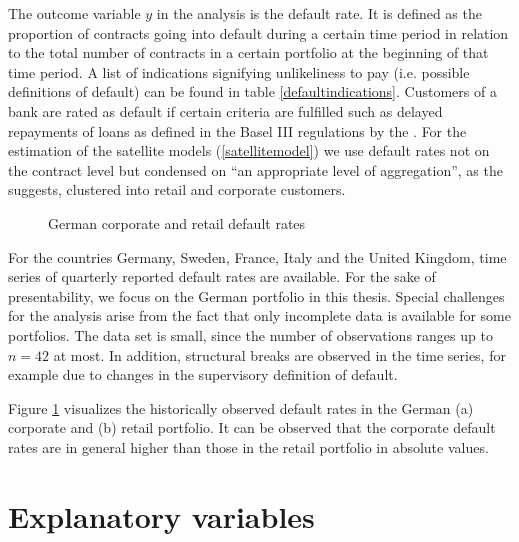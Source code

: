 \documentclass[a4paper, 12pt]{scrreprt}
\begin{document}
\clearpage






The outcome variable $y$ in the analysis is the default rate. It is defined as the proportion of contracts going into default during a certain time period in relation to the total number of contracts in a certain portfolio at the beginning of that time period.
A list of indications signifying unlikeliness to pay (i.e. possible definitions of default) can be found in table \ref{defaultindications}. Customers of a bank are rated as default if certain criteria are fulfilled such as delayed repayments of loans as defined in the Basel III regulations by the \textcite{bcbs2010baselIII}. 
For the estimation of the satellite models (\ref{satellitemodel}) we use default rates not on the contract level but condensed on ``an appropriate level of aggregation'', as the \textcite[chapter 5.5]{ecb2018srep} suggests, clustered into retail and corporate customers.

\begin{figure}[H]
	\caption{German corporate and retail default rates}
	\label{plot:germandefaultrates}
\end{figure}


For the countries Germany, Sweden, France, Italy and the United Kingdom, time series of quarterly reported default rates are available. For the sake of presentability, we focus on the German portfolio in this thesis.
Special challenges for the analysis arise from the fact that only incomplete data is available for some portfolios. The data set is small, since the number of observations ranges up to $n=42$ at most. In addition, structural breaks are observed in the time series, for example due to changes in the supervisory definition of default. 

Figure \ref{plot:germandefaultrates} visualizes the historically observed default rates in the German (a) corporate and (b) retail portfolio.
It can be observed that the corporate default rates are in general higher than those in the retail portfolio in absolute values. 

\section{Explanatory variables}
\end{document}
